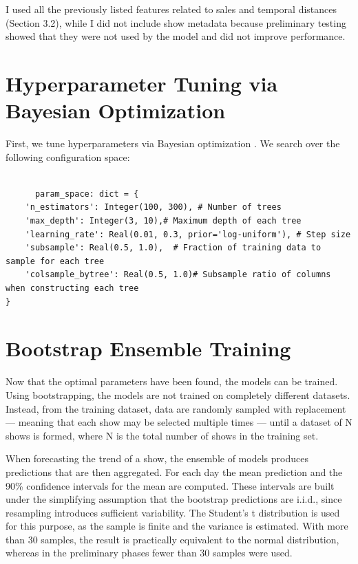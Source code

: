 \documentclass{Configuration_Files/PoliMi3i_thesis}
\begin{document}
I used all the previously listed features related to sales and temporal distances (Section 3.2), while I did not include show metadata because preliminary testing showed that they were not used by the model and did not improve performance.

\section{Hyperparameter Tuning via Bayesian Optimization}
First, we tune hyperparameters via Bayesian optimization \cite{snoek2012practical}. We search over the following configuration space:

\begin{verbatim}

      param_space: dict = {
    'n_estimators': Integer(100, 300), # Number of trees
    'max_depth': Integer(3, 10),# Maximum depth of each tree
    'learning_rate': Real(0.01, 0.3, prior='log-uniform'), # Step size 
    'subsample': Real(0.5, 1.0),  # Fraction of training data to sample for each tree
    'colsample_bytree': Real(0.5, 1.0)# Subsample ratio of columns when constructing each tree
}
      \end{verbatim}

\section{Bootstrap Ensemble Training}
Now that the optimal parameters have been found, the models can be trained.
Using bootstrapping, the models are not trained on completely different datasets. Instead, from the training dataset, data are randomly sampled with replacement — meaning that each show may be selected multiple times — until a dataset of N shows is formed, where N is the total number of shows in the training set.

When forecasting the trend of a show, the ensemble of models produces predictions that are then aggregated. For each day the mean prediction and the 90\% confidence intervals for the mean are computed. These intervals are built under the simplifying assumption that the bootstrap predictions are i.i.d., since resampling introduces sufficient variability. The Student’s t distribution is used for this purpose, as the sample is finite and the variance is estimated. With more than 30 samples, the result is practically equivalent to the normal distribution, whereas in the preliminary phases fewer than 30 samples were used.
\end{document}
